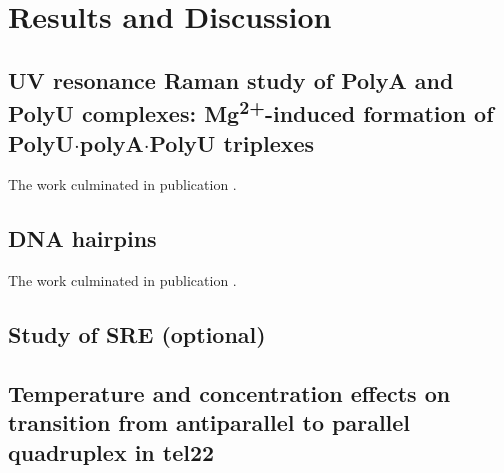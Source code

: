 \chapter{Results and Discussion}









\section[\texorpdfstring{%
    UV resonance Raman study of PolyA and PolyU complexes:\\
		Mg\textsuperscript{2+}\babelhyphen{nobreak}induced formation of
		PolyU$\cdot$polyA$\cdot$PolyU triplexes
}{%
    UV resonance Raman study of PolyA and PolyU complexes:
		Mg\texttwosuperior\textplussuperior-induced formation of PolyU·polyA·PolyU
		triplexes
}]{%
    UV resonance Raman study of PolyA and PolyU complexes:
		Mg\textsuperscript{2+}-induced formation of PolyU$\cdot$polyA$\cdot$PolyU
		triplexes
}%

The work culminated in publication \textcite{Klener2015}.

\section{DNA hairpins}

The work culminated in publication \textcite{Klener2021}.

\section{Study of SRE (optional)}

\section[%
	Temperature and concentration effects on transition from antiparallel	to
	parallel quadruplex in tel22 (optional)
]{%
	Temperature and concentration effects on transition from antiparallel to
	parallel\\quadruplex in tel22}
